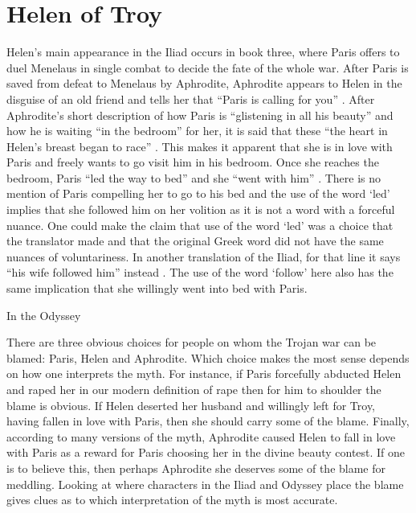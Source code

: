 \documentclass[11pt]{article}
\begin{document}
\section{Helen of Troy}
Helen's main appearance in the Iliad occurs in book three, where Paris offers to duel Menelaus in single combat to decide the fate of the whole war.
After Paris is saved from defeat to Menelaus by Aphrodite, Aphrodite appears to Helen in the disguise of an old friend and tells her that ``Paris is calling for you'' \cite[book 3, line 450]{iliad}.
After Aphrodite's short description of how Paris is ``glistening in all his beauty'' and how he is waiting ``in the bedroom'' for her, it is said that these ``the heart in Helen's breast began to race'' \cite[book 3, line 456]{iliad}.
This makes it apparent that she is in love with Paris and freely wants to go visit him in his bedroom.
Once she reaches the bedroom, Paris ``led the way to bed'' and she ``went with him'' \cite[book 3, line 525]{iliad}.
There is no mention of Paris compelling her to go to his bed and the use of the word `led' implies that she followed him on her volition as it is not a word with a forceful nuance.
One could make the claim that use of the word `led' was a choice that the translator made and that the original Greek word did not have the same nuances of voluntariness.
In another translation of the Iliad, for that line it says ``his wife followed him'' instead \cite[book 3, line 448]{iliad-rieu}.
The use of the word `follow' here also has the same implication that she willingly went into bed with Paris.



In the Odyssey 


There are three obvious choices for people on whom the Trojan war can be blamed: Paris, Helen and Aphrodite.
Which choice makes the most sense depends on how one interprets the myth.
For instance, if Paris forcefully abducted Helen and raped her in our modern definition of rape then for him to shoulder the blame is obvious.
If Helen deserted her husband and willingly left for Troy, having fallen in love with Paris, then she should carry some of the blame.
Finally, according to many versions of the myth, Aphrodite caused Helen to fall in love with Paris as a reward for Paris choosing her in the divine beauty contest.
If one is to believe this, then perhaps Aphrodite she deserves some of the blame for meddling.
Looking at where characters in the Iliad and Odyssey place the blame gives clues as to which interpretation of the myth is most accurate.
\end{document}
